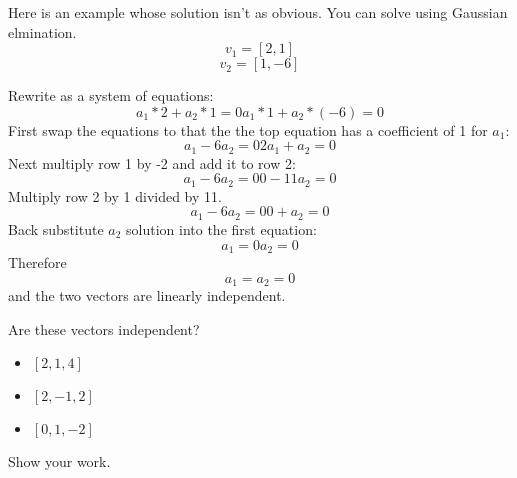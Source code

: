 Here is an example whose solution isn't as obvious. You can solve using Gaussian elmination.
$$v_1 = [2,1]$$
$$v_2 = [1,-6]$$

Rewrite as a system of equations:
$$
	a_1*2 + a_2*1 = 0 
	a_1*1 + a_2*(-6) = 0
$$
First swap the equations to that the the top equation has a coefficient of 1 for $a_1$:
$$
	a_1 - 6a_2 = 0 
	2a_1 + a_2 = 0 
$$
Next multiply row 1 by -2 and add it to row 2:
$$
	a_1 - 6a_2 = 0 
	0  - 11a_2 = 0 
$$
Multiply row 2 by 1 divided by 11.
$$
	a_1 - 6a_2 = 0 
	0  +  a_2 = 0 
$$
Back substitute $a_2$ solution into the first equation:
$$
	a_1  = 0 
	a_2 = 0 
$$
Therefore $$a_1 = a_2 = 0$$ and the two vectors are linearly independent.

\begin{Exercise}[title={Vector Independence}, label=vector_independence]
    Are these vectors independent? 
    \begin{itemize}
    	\item $[2, 1, 4]$
    	\item $[2, -1, 2]$ 
    	\item $[0, 1, -2]$
    \end{itemize}
    Show your work.
\end{Exercise}
